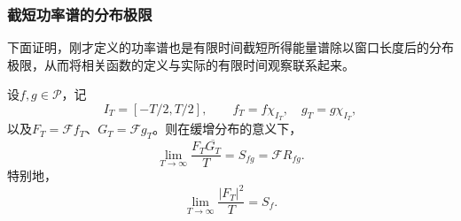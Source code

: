 \subsubsection{截短功率谱的分布极限}

下面证明，刚才定义的功率谱也是有限时间截短所得能量谱除以窗口长度后的分布极限，从而将相关函数的定义与实际的有限时间观察联系起来。

\begin{theorem}\label{thm:power_winner_khinchin}
    设$f,g\in\mathcal{P}$，记
    \begin{equation}
        I_T=[-T/2,T/2],\qquad f_T=f\chi_{I_T},\quad g_T=g\chi_{I_T},
    \end{equation}
    以及$F_T=\mathcal{F}f_T$、$G_T=\mathcal{F}g_T$。则在缓增分布的意义下，
    \begin{equation}
        \lim_{T\to\infty}\frac{F_T\overline{G_T}}{T}=S_{fg}=\mathcal{F}R_{fg}.
    \end{equation}
    特别地，
    \begin{equation}
        \lim_{T\to\infty}\frac{|F_T|^2}{T}=S_f.
    \end{equation}
\end{theorem}
